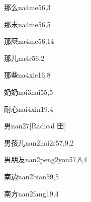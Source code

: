 \begin{verbete}{那么}{na4me5}{6,3}
\end{verbete}

\begin{verbete}{那末}{na4me5}{6,5}
\end{verbete}

\begin{verbete}{那麽}{na4me5}{6,14}
\end{verbete}

\begin{verbete}{那儿}{na4r5}{6,2}
\end{verbete}

\begin{verbete}{那些}{na4xie1}{6,8}
\end{verbete}

\begin{verbete}{奶奶}{nai3nai5}{5,5}
\end{verbete}

\begin{verbete}{耐心}{nai4xin1}{9,4}
\end{verbete}

\begin{verbete}{男}{nan2}{7}[Radical 田]
\end{verbete}

\begin{verbete}{男孩儿}{nan2hai2r5}{7,9,2}
\end{verbete}

\begin{verbete}{男朋友}{nan2peng2you5}{7,8,4}
\end{verbete}

\begin{verbete}{南边}{nan2bian5}{9,5}
\end{verbete}

\begin{verbete}{南方}{nan2fang1}{9,4}
\end{verbete}

